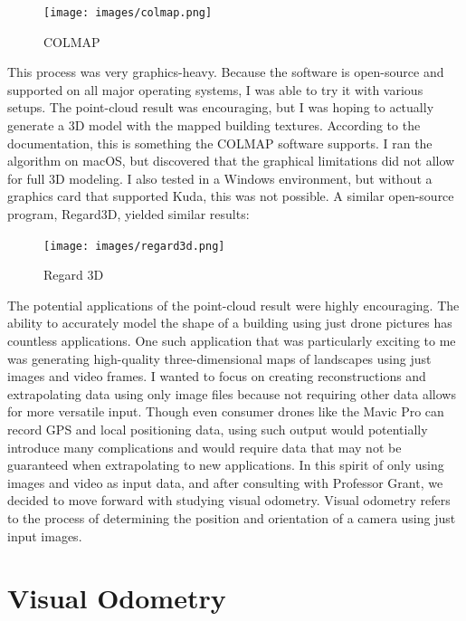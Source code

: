 \begin{figure}[htbp]
\centering
\texttt{[image: images/colmap.png]}
\caption{COLMAP}
\end{figure}

This process was very graphics-heavy. Because the software is open-source and supported on all major operating systems, I was able to try it with various setups. The point-cloud result was encouraging, but I was hoping to actually generate a 3D model with the mapped building textures. According to the documentation, this is something the COLMAP software supports. I ran the algorithm on macOS, but discovered that the graphical limitations did not allow for full 3D modeling. I also tested in a Windows environment, but without a graphics card that supported Kuda, this was not possible. A similar open-source program, Regard3D, yielded similar results: 

\begin{figure}[htbp]
\centering
\texttt{[image: images/regard3d.png]}
\caption{Regard 3D}
\end{figure}

The potential applications of the point-cloud result were highly encouraging. The ability to accurately model the shape of a building using just drone pictures has countless applications. One such application that was particularly exciting to me was generating high-quality three-dimensional maps of landscapes using just images and video frames. I wanted to focus on creating reconstructions and extrapolating data using only image files because not requiring other data allows for more versatile input. Though even consumer drones like the Mavic Pro can record GPS and local positioning data, using such output would potentially introduce many complications and would require data that may not be guaranteed when extrapolating to new applications. In this spirit of only using images and video as input data, and after consulting with Professor Grant, we decided to move forward with studying visual odometry. Visual odometry refers to the process of determining the position and orientation of a camera using just input images. 

\chapter{Visual Odometry}
\label{visualodometry}

